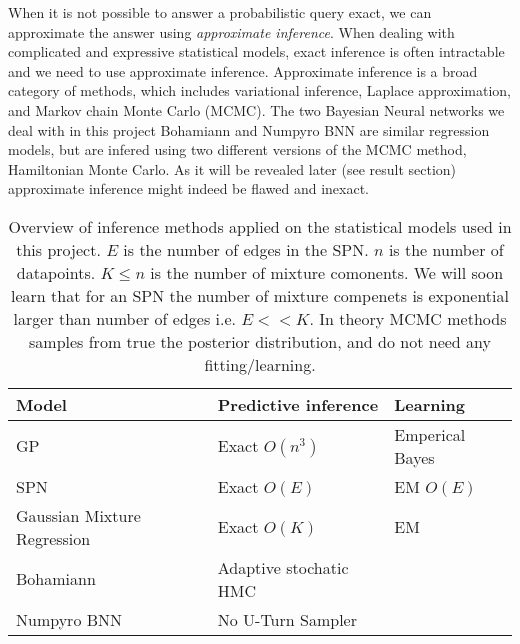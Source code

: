 When it is not possible to answer a probabilistic query exact, we can approximate the
answer using \textit{approximate inference}. When dealing with complicated and expressive statistical models, exact inference is often
intractable and we need to use approximate inference. Approximate inference 
is a broad category of methods, which includes 
variational inference, Laplace approximation, and Markov chain Monte Carlo (MCMC).
The two Bayesian Neural networks we deal with in this project Bohamiann and Numpyro BNN are
similar regression models, but are infered using two different versions of the MCMC 
method, Hamiltonian Monte Carlo. As it will be revealed later (see result section) 
approximate inference might indeed be flawed and inexact. 

\begin{table}[H]
    \centering
    \begin{tabular}{l|l|l}
    \textbf{Model} & \textbf{Predictive inference} &   \textbf{Learning} \\ \hline
    GP          & Exact $O(n^3)$  & Emperical Bayes\\
    SPN             & Exact $O(E)$ &  EM $O(E)$\\
    Gaussian Mixture Regression & Exact $O(K)$ & EM  \\
    Bohamiann                             & Adaptive stochatic HMC & \\
    Numpyro BNN                           & No U-Turn Sampler & 
    \end{tabular}
    \caption{Overview of inference methods applied on the statistical models 
            used in this project. $E$ is the number of edges in the SPN. $n$ is the number of datapoints. 
            $K \leq n$ is the number of mixture comonents. We will soon learn that for an
            SPN the number of mixture compenets is exponential larger than number of edges
            i.e. $E << K$. In theory MCMC methods samples 
            from true the posterior distribution, and do not need any fitting/learning. 
            }
\end{table}

